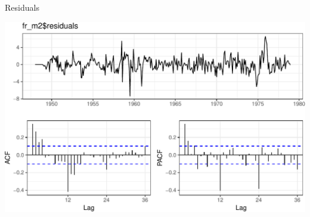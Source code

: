 \documentclass[11pt,ignorenonframetext,]{beamer}
\begin{document}
\begin{frame}{%
\protect\hypertarget{residuals-1}{%
Residuals}}

\begin{center}\includegraphics[width=\textwidth]{Lec11_files/figure-beamer/unnamed-chunk-19-1} \end{center}

\end{frame}
\end{document}
